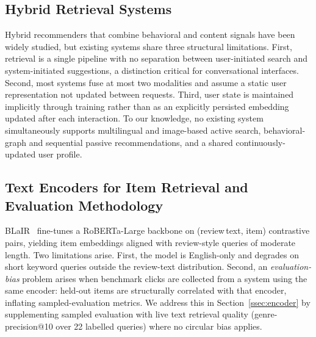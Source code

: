 \subsection{Hybrid Retrieval Systems}
Hybrid recommenders that combine behavioral and content signals have been
widely studied, but existing systems share three structural limitations.
First, retrieval is a single pipeline with no separation between user-initiated
search and system-initiated suggestions, a distinction critical for
conversational interfaces.
Second, most systems fuse at most two modalities and assume a static user
representation not updated between requests.
Third, user state is maintained implicitly through training rather than as an
explicitly persisted embedding updated after each interaction.
To our knowledge, no existing system simultaneously supports multilingual and
image-based active search, behavioral-graph and sequential passive
recommendations, and a shared continuously-updated user profile.

\subsection{Text Encoders for Item Retrieval and Evaluation Methodology}
BLaIR~\cite{hou2024amazon} fine-tunes a RoBERTa-Large backbone on
(review\,text, item) contrastive pairs, yielding item embeddings aligned
with review-style queries of moderate length.
Two limitations arise.
First, the model is English-only and degrades on short keyword queries outside
the review-text distribution.
Second, an \emph{evaluation-bias} problem arises when benchmark clicks are
collected from a system using the same encoder: held-out items are structurally
correlated with that encoder, inflating sampled-evaluation metrics.
We address this in Section~\ref{ssec:encoder} by supplementing sampled
evaluation with live text retrieval quality (genre-precision@10 over 22
labelled queries) where no circular bias applies.

